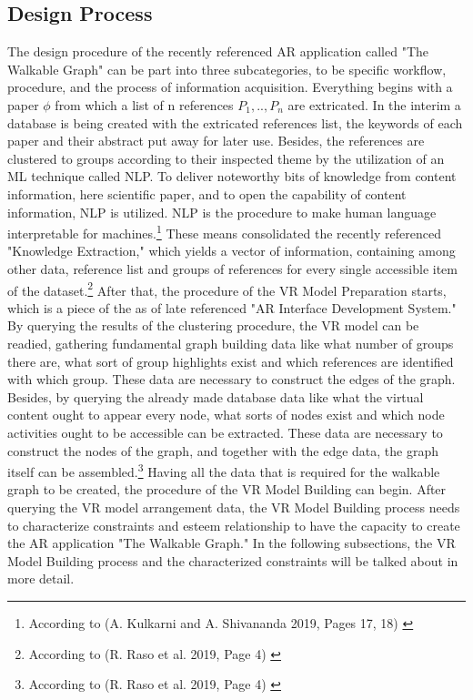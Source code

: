 \documentclass[12pt,a4paper,oneside,american,parskip=half]{article}
\begin{document}
\begin{justify}
\begin{normalsize}
\subsection{Design Process}
The design procedure of the recently referenced AR application called "The Walkable Graph" can be part into three subcategories, to be specific workflow, procedure, and the process of information acquisition.
\newline
Everything begins with a paper $\phi$ from which a list of n references $P_1, .., P_n$ are extricated. In the interim a database is being created with the extricated references list, the keywords of each paper and their abstract put away for later use. Besides, the references are clustered to groups according to their inspected theme by the utilization of an ML technique called NLP.
To deliver noteworthy bits of knowledge from content information, here scientific paper, and to open the capability of content information, NLP is utilized. NLP is the procedure to make human language interpretable for machines.\footnote{According to (A. Kulkarni and A. Shivananda 2019, Pages 17, 18) \cite{NLP}}
\newline
These means consolidated the recently referenced "Knowledge Extraction," which yields a vector of information, containing among other data, reference list and groups of references for every single accessible item of the dataset.\footnote{According to (R. Raso et al. 2019, Page 4) \cite{walkable}}
After that, the procedure of the VR Model Preparation starts, which is a piece of the as of late referenced "AR Interface Development System."
\newline
By querying the results of the clustering procedure, the VR model can be readied, gathering fundamental graph building data like what number of groups there are, what sort of group highlights exist and which references are identified with which group. These data are necessary to construct the edges of the graph. Besides, by querying the already made database data like what the virtual content ought to appear every node, what sorts of nodes exist and which node activities ought to be accessible can be extracted. These data are necessary to construct the nodes of the graph, and together with the edge data, the graph itself can be assembled.\footnote{According to (R. Raso et al. 2019, Page 4) \cite{walkable}}
\newline
Having all the data that is required for the walkable graph to be created, the procedure of the VR Model Building can begin. After querying the VR model arrangement data, the VR Model Building process needs to characterize constraints and esteem relationship to have the capacity to create the AR application "The Walkable Graph." 
In the following subsections, the VR Model Building process and the characterized constraints will be talked about in more detail.


\end{normalsize}
\end{justify}
\end{document}
